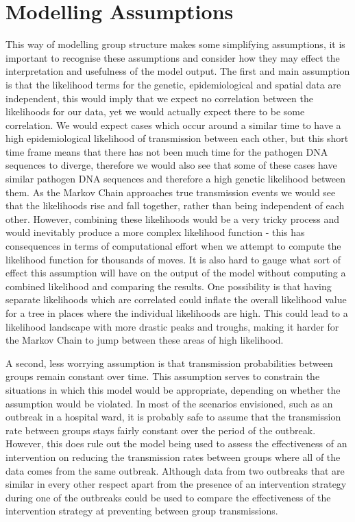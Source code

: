 \documentclass[11pt,a4paper]{report}
\begin{document}
\section{Modelling Assumptions}
This way of modelling group structure makes some simplifying assumptions, it is important to recognise these assumptions and consider how they may effect the interpretation and usefulness of the model output. The first and main assumption is that the likelihood terms for the genetic, epidemiological and spatial data are independent, this would imply that we expect no correlation between the likelihoods for our data, yet we would actually expect there to be some correlation. We would expect cases which occur around a similar time to have a high epidemiological likelihood of transmission between each other, but this short time frame means that there has not been much time for the pathogen DNA sequences to diverge, therefore we would also see that some of these cases have similar pathogen DNA sequences and therefore a high genetic likelihood between them. As the Markov Chain approaches true transmission events we would see that the likelihoods rise and fall together, rather than being independent of each other. However, combining these likelihoods would be a very tricky process and would inevitably produce a more complex likelihood function - this has consequences in terms of computational effort when we attempt to compute the likelihood function for thousands of moves. It is also hard to gauge what sort of effect this assumption will have on the output of the model without computing a combined likelihood and comparing the results. One possibility is that having separate likelihoods which are correlated could inflate the overall likelihood value for a tree in places where the individual likelihoods are high. This could lead to a likelihood landscape with more drastic peaks and troughs, making it harder for the Markov Chain to jump between these areas of high likelihood.

A second, less worrying assumption is that transmission probabilities between groups remain constant over time. This assumption serves to constrain the situations in which this model would be appropriate, depending on whether the assumption would be violated. In most of the scenarios envisioned, such as an outbreak in a hospital ward, it is probably safe to assume that the transmission rate between groups stays fairly constant over the period of the outbreak. However, this does rule out the model being used to assess the effectiveness of an intervention on reducing the transmission rates between groups where all of the data comes from the same outbreak. Although data from two outbreaks that are similar in every other respect apart from the presence of an intervention strategy during one of the outbreaks could be used to compare the effectiveness of the intervention strategy at preventing between group transmissions.
\end{document}
